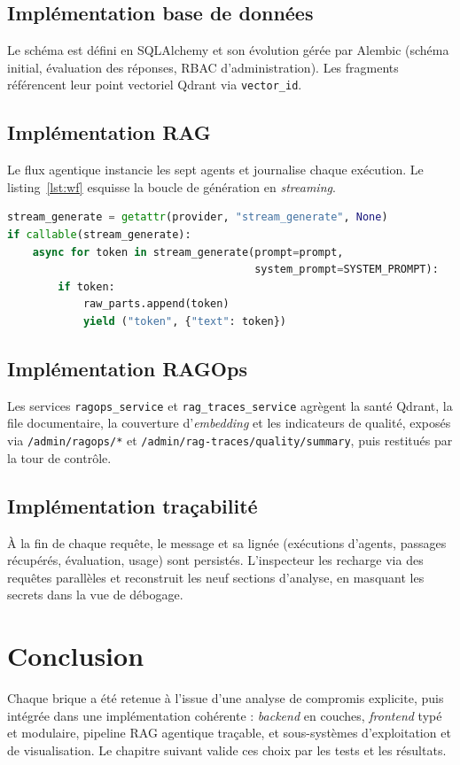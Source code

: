 \subsection{Implémentation base de données}
Le schéma est défini en SQLAlchemy et son évolution gérée par Alembic (schéma
initial, évaluation des réponses, RBAC d'administration). Les fragments
référencent leur point vectoriel Qdrant via \texttt{vector\_id}.

\subsection{Implémentation RAG}
Le flux agentique instancie les sept agents et journalise chaque exécution. Le
listing~\ref{lst:wf} esquisse la boucle de génération en \emph{streaming}.

\begin{lstlisting}[style=code,language=Python,caption={Génération en streaming (extrait)},label={lst:wf}]
stream_generate = getattr(provider, "stream_generate", None)
if callable(stream_generate):
    async for token in stream_generate(prompt=prompt,
                                       system_prompt=SYSTEM_PROMPT):
        if token:
            raw_parts.append(token)
            yield ("token", {"text": token})
\end{lstlisting}

\subsection{Implémentation RAGOps}
Les services \texttt{ragops\_service} et \texttt{rag\_traces\_service} agrègent la
santé Qdrant, la file documentaire, la couverture d'\emph{embedding} et les
indicateurs de qualité, exposés via \texttt{/admin/ragops/*} et
\texttt{/admin/rag-traces/quality/summary}, puis restitués par la tour de contrôle.

\subsection{Implémentation traçabilité}
À la fin de chaque requête, le message et sa lignée (exécutions d'agents, passages
récupérés, évaluation, usage) sont persistés. L'inspecteur les recharge via des
requêtes parallèles et reconstruit les neuf sections d'analyse, en masquant les
secrets dans la vue de débogage.

\section{Conclusion}
Chaque brique a été retenue à l'issue d'une analyse de compromis explicite, puis
intégrée dans une implémentation cohérente : \emph{backend} en couches,
\emph{frontend} typé et modulaire, pipeline RAG agentique traçable, et
sous-systèmes d'exploitation et de visualisation. Le chapitre suivant valide ces
choix par les tests et les résultats.
